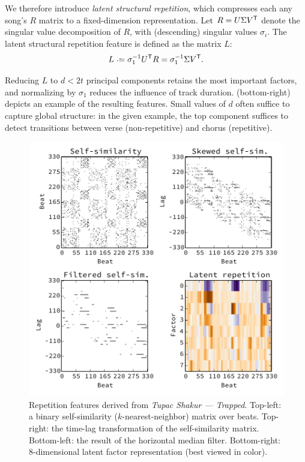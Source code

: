 \documentclass{article}
\begin{document}
We therefore introduce \emph{latent structural repetition}, which compresses each
any song's $R$ matrix to a fixed-dimension representation.  Let $R = U\Sigma V^\mathsf{T}$ denote the singular value decomposition of $R$,
with (descending) singular values $\sigma_i$. 
The latent structural repetition feature is defined as the matrix $L$:
\begin{equation}
L \defeq \sigma_1^{-1} U\trans R = \sigma_1^{-1} \Sigma V\trans.\label{eq:latent-rep}
\end{equation}

Reducing $L$ to $d < 2t$ principal components retains the most important factors, and normalizing by $\sigma_1$ reduces 
the influence of track duration. 
 (bottom-right) depicts an example of the resulting features.  
Small values of $d$ often suffice to capture global structure: in the given
example, the top component suffices to detect transitions between verse 
(non-repetitive) and chorus (repetitive).

\begin{figure}
\centering%
\includegraphics[width=\columnwidth]{figs/rep}
\vspace{-2\baselineskip}
\caption{Repetition features derived from \emph{Tupac Shakur --- Trapped}. 
Top-left: a binary self-similarity ($k$-nearest-neighbor) matrix over beats.
Top-right: the time-lag transformation of the self-similarity matrix.
Bottom-left: the result of the horizontal median filter.
Bottom-right: 8-dimensional latent factor representation (best viewed in color).}
\label{fig:rep}
\end{figure}
\end{document}
